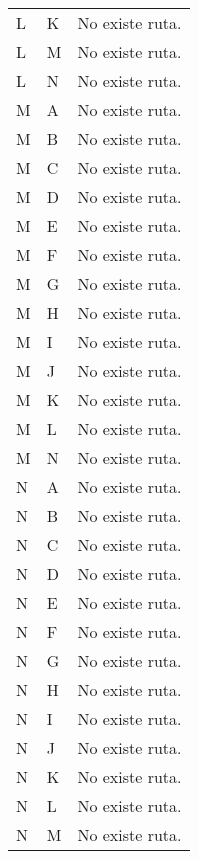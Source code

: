 \documentclass{article}
\begin{document}
\begin{longtable}{llp{}}
L & K & No existe ruta.\\
L & M & No existe ruta.\\
L & N & No existe ruta.\\
M & A & No existe ruta.\\
M & B & No existe ruta.\\
M & C & No existe ruta.\\
M & D & No existe ruta.\\
M & E & No existe ruta.\\
M & F & No existe ruta.\\
M & G & No existe ruta.\\
M & H & No existe ruta.\\
M & I & No existe ruta.\\
M & J & No existe ruta.\\
M & K & No existe ruta.\\
M & L & No existe ruta.\\
M & N & No existe ruta.\\
N & A & No existe ruta.\\
N & B & No existe ruta.\\
N & C & No existe ruta.\\
N & D & No existe ruta.\\
N & E & No existe ruta.\\
N & F & No existe ruta.\\
N & G & No existe ruta.\\
N & H & No existe ruta.\\
N & I & No existe ruta.\\
N & J & No existe ruta.\\
N & K & No existe ruta.\\
N & L & No existe ruta.\\
N & M & No existe ruta.\\
\bottomrule
\end{longtable}
\end{document}
